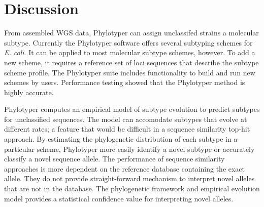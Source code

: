 \documentclass{bioinfo}
\begin{document}


\section{Discussion}

From assembled WGS data, Phylotyper can assign unclassifed strains a molecular subtype.
Currently the Phylotyper software offers several subtyping schemes for \textit{E. coli}.
It can be applied to most molecular subtype schemes, however.
To add a new scheme, it requires a reference set of loci sequences that describe the subtype scheme profile.
The Phylotyper suite includes functionality to build and run new schemes by users.
Performance testing showed that the Phylotyper method is highly accurate.

Phylotyper computes an empirical model of subtype evolution to predict subtypes for unclassified sequences. 
The model can accomodate subtypes that evolve at different rates; a feature that would be difficult in a sequence similarity top-hit approach. 
By estimating the phylogenetic distribution of each subtype in a particular scheme, Phylotyper more easily identify a novel subtype or accurately classify a novel sequence allele.
The performance of sequence similarity approaches is more dependent on the reference database containing the exact allele.  
They do not provide straight-forward mechanism to interpret novel alleles that are not in the database.
The phylogenetic framework and empirical evolution model provides a statistical confidence value for interpreting novel alleles.
\end{document}
